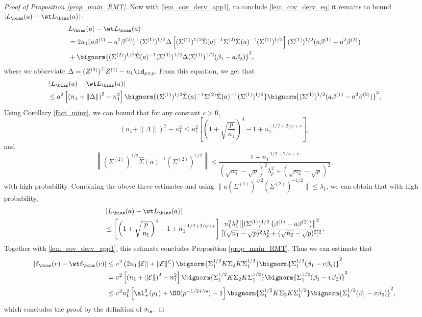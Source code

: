 \documentclass[aos,preprint]{imsart}
\begin{document}
\begin{proof}[Proof of Proposition \ref{prop_main_RMT}]
Now with \eqref{lem_cov_derv_app1}, to conclude \eqref{lem_cov_derv_eq} it remains to bound $ |L_{\bias}(a)-\wt L_{\bias}(a)|$: 
\begin{align*}
&L_{\bias}(a)-\wt L_{\bias}(a) \\
&= {2 n_1}(a\beta^{(1)} - a^2\beta^{(2)})^{\top}(\Sigma^{(1)})^{1/2}\Delta \left[(\Sigma^{(1)})^{1/2}\hat \Sigma(a)^{-1} \Sigma^{(2)} \hat \Sigma(a)^{-1} (\Sigma^{(1)})^{1/2}\right](\Sigma^{(1)})^{1/2} (a\beta^{(1)} - a^2\beta^{(2)}) \nonumber
		\\
		&+ \bignorm{(\Sigma^{(2)})^{1/2} \hat \Sigma(a)^{-1} (\Sigma^{(1)})^{1/2}\Delta  (\Sigma^{(1)})^{1/2}(\beta_1 - a\beta_2)}^2,
		\end{align*}
		where we abbreviate $\Delta = (Z^{(1)})^{\top}Z^{(1)} - {n_1}\id_{p\times p}$. From this equation, we get that
\begin{align*}
		&\left|L_{\bias}(a)-\wt L_{\bias}(a)\right|\\
		&\le a^2 \left[\left( n_1 + \|\Delta\|\right)^2 -n_1^2 \right] \bignorm{(\Sigma^{(1)})^{1/2} \hat \Sigma(a)^{-1}  \Sigma^{(2)}  \hat \Sigma(a)^{-1} (\Sigma^{(1)})^{1/2}} \bignorm{(\Sigma^{(1)})^{1/2} (a\beta^{(1)} - a^2\beta^{(2)})}^2,
	\end{align*}
 Using Corollary \ref{fact_minv}, we can bound that for any constant $c>0$,
	$$\left( n_1 + \|\Delta\|\right)^2 -n_1^2\le n_1^2\left[\left( 1+\sqrt{\frac{p}{n_1}}\right)^4 - 1 + n_1^{-1/2+2/\varphi + c}\right], $$
	and
	$$\left\|(\Sigma^{(2)})^{1/2}\hat \Sigma(a)^{-1}  (\Sigma^{(2)})^{1/2}\right\| \le \frac{1+ n_1^{-1/2+2/\varphi + c}}{ (\sqrt{n_1}-\sqrt{p})^2 \lambda_p^2+ (\sqrt{n_2}-\sqrt{p})^2} ,$$
	with high probability. Combining the above three estimates and using $\| a(\Sigma^{(1)})^{1/2}(\Sigma^{(2)})^{-1/2}\| \le \lambda_1$, we can obtain that with high probability,
	\begin{align*}
				&\left|L_{\bias}(a)-\wt L_{\bias}(a)\right| \nonumber\\
				& \le \left[\left( 1+\sqrt{\frac{p}{n_1}}\right)^4 - 1 + n_1^{-1/2+2/\varphi + c}\right] \frac{n_1^2 \lambda_1^2 \left\|(\Sigma^{(1)})^{1/2} \left(\beta^{(1)}- a\beta^{(2)}\right) \right\|^2}{  [(\sqrt{n_1}-\sqrt{p})^2 \lambda_p^2+ (\sqrt{n_2}-\sqrt{p})^2]^2} .
			\end{align*}
	Together with \eqref{lem_cov_derv_app1}, this estimate concludes Proposition \ref{prop_main_RMT}. 
	\iffalse
	Thus we can estimate that 
	\begin{align*}
	| \delta_{\bias}(v)-\wt\delta_{\bias}(v)|&\le v^2 \left( 2n_1  \|\cal E\| +  \|\cal E\|^2 \right) \bignorm{\Sigma_1^{1/2} K \Sigma_2 K \Sigma_1^{1/2}} \bignorm{\Sigma_1^{1/2} (\beta_1 - v\beta_2)}^2 \\
	&=  v^2 \left[\left( n_1 + \|\cal E\|\right)^2 -n_1^2 \right] \bignorm{\Sigma_1^{1/2} K \Sigma_2 K \Sigma_1^{1/2}} \bignorm{\Sigma_1^{1/2} (\beta_1 - v\beta_2)}^2 \\
	& \le v^2 n_1^2 \left[ \al_+^2(\rho_1) + \OO(p^{-1/2+\e}) -1\right]\bignorm{\Sigma_1^{1/2} K \Sigma_2 K \Sigma_1^{1/2}} \bignorm{\Sigma_1^{1/2} (\beta_1 - v\beta_2)}^2,
	\end{align*}
	which concludes the proof by the definition of $\delta_\e$.	


\end{proof}
\end{document}
